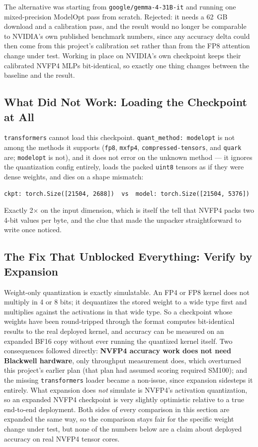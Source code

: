 \documentclass[11pt]{article}
\begin{document}
The alternative was starting from \texttt{google/gemma-4-31B-it} and running one
mixed-precision ModelOpt pass from scratch. Rejected: it needs a 62~GB download and a
calibration pass, and the result would no longer be comparable to NVIDIA's own published
benchmark numbers, since any accuracy delta could then come from this project's
calibration set rather than from the FP8 attention change under test. Working in place
on NVIDIA's own checkpoint keeps their calibrated NVFP4 MLPs bit-identical, so exactly
one thing changes between the baseline and the result.

\subsection{What Did Not Work: Loading the Checkpoint at All}

\texttt{transformers} cannot load this checkpoint. \texttt{quant\_method: modelopt} is
not among the methods it supports (\texttt{fp8}, \texttt{mxfp4},
\texttt{compressed-tensors}, and \texttt{quark} are; \texttt{modelopt} is not), and it
does not error on the unknown method --- it ignores the quantization config entirely,
loads the packed \texttt{uint8} tensors as if they were dense weights, and dies on a
shape mismatch:

\begin{lstlisting}
ckpt: torch.Size([21504, 2688])  vs  model: torch.Size([21504, 5376])
\end{lstlisting}

Exactly 2$\times$ on the input dimension, which is itself the tell that NVFP4 packs two
4-bit values per byte, and the clue that made the unpacker straightforward to write once
noticed.

\subsection{The Fix That Unblocked Everything: Verify by Expansion}

Weight-only quantization is exactly simulatable. An FP4 or FP8 kernel does not multiply
in 4 or 8 bits; it dequantizes the stored weight to a wide type first and multiplies
against the activations in that wide type. So a checkpoint whose weights have been
round-tripped through the format computes bit-identical results to the real deployed
kernel, and accuracy can be measured on an expanded BF16 copy without ever running the
quantized kernel itself. Two consequences followed directly: \textbf{NVFP4 accuracy work
does not need Blackwell hardware}, only throughput measurement does, which overturned
this project's earlier plan (that plan had assumed scoring required SM100); and the
missing \texttt{transformers} loader became a non-issue, since expansion sidesteps it
entirely. What expansion does \emph{not} simulate is NVFP4's activation quantization, so
an expanded NVFP4 checkpoint is very slightly optimistic relative to a true end-to-end
deployment. Both sides of every comparison in this section are expanded the same way, so
the comparison stays fair for the specific weight change under test, but none of the
numbers below are a claim about deployed accuracy on real NVFP4 tensor cores.
\end{document}
